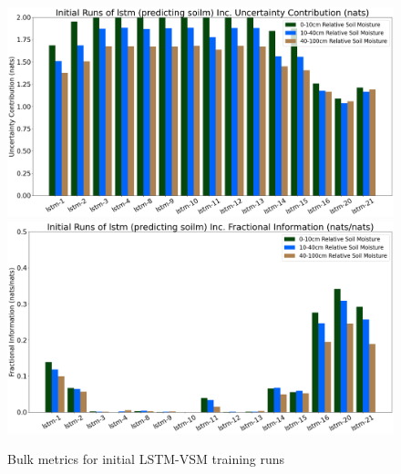 \begin{figure}[hp!]
    \includegraphics[width=.48\linewidth,draft=false]{figures/efficiency_initial-best/eval_test_efficiency_initial-lstm-soilm_info-loss_res.png}
    \includegraphics[width=.48\linewidth,draft=false]{figures/efficiency_initial-best/eval_test_efficiency_initial-lstm-soilm_fi_res.png}

    \caption{Bulk metrics for initial LSTM-VSM training runs}
    \label{model-init-vsm}
\end{figure}

